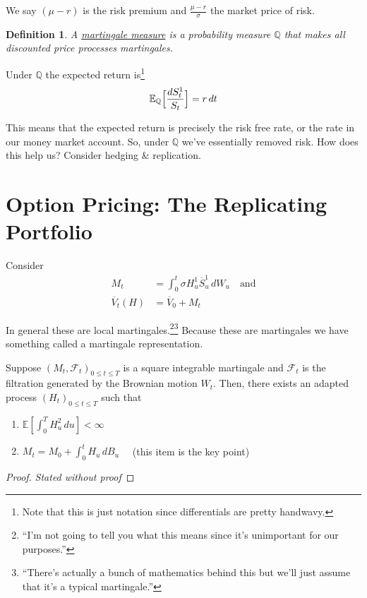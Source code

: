 \documentclass[12pt]{article}
\newenvironment{theorem}[2][Theorem:]{\begin{trivlist} %
\item[\hskip \labelsep {\bfseries #1}\hskip \labelsep {\bfseries #2.}]}{\end{trivlist}}
\newtheorem{definition}{Definition}
\newlength\tindent
\renewcommand{\indent}{\hspace*{\tindent}}
\begin{document}
We say $(\mu - r)$ is the risk premium and $\frac{\mu - r}{\sigma}$ the market price of risk.

\begin{definition} A \underline{martingale measure} is a probability measure $\mathbb Q$ that makes all discounted price processes martingales.
\end{definition}

Under $\mathbb Q$ the expected return is\footnote{Note that this is just notation since differentials are pretty handwavy.}
\begin{equation*}
	\mathbb E_{\mathbb Q}\Big[\frac{dS^1_t}{S_t}\Big] = r \,dt \\
\end{equation*}

\indent This means that the expected return is precisely the risk free rate, or the rate in our money market account. So, under $\mathbb Q$ we've essentially removed risk. How does this help us? Consider hedging \& replication.

\section{Option Pricing: The Replicating Portfolio}

Consider 
\begin{align*}
	M_t &= \int^t_0 \sigma H^1_u \overline{S}^1_u\,dW_u \quad \text{and} \\
	\overline{V}_t(H) &= \overline{V}_0 + M_t
\end{align*}

\indent In general these are local martingales.\footnote{``I'm not going to tell you what this means since it's unimportant for our purposes.''}\footnote{``There's actually a bunch of mathematics behind this but we'll just assume that it's a typical martingale.''} Because these are martingales we have something called a martingale representation.

\begin{theorem}{Martingale Representation Theorem/It\^{o} Representation Theorem\footnotemark} Suppose $(M_t,\mathcal F_t)_{0\leq t\leq T}$ is a square integrable martingale and $\mathcal F_t$ is the filtration generated by the Brownian motion $W_t$. Then, there exists an adapted process $(H_t)_{0\leq t \leq T}$ such that
\begin{enumerate}
	\item $\mathbb E[\int^T_0 H^2_u\,du] < \infty$
	\item $M_t = M_0 + \int^t_0 H_u\,dB_u \quad$ (this item is the key point)
\end{enumerate}

\begin{proof} {\em Stated without proof}
\end{proof}
\end{theorem}
\end{document}

